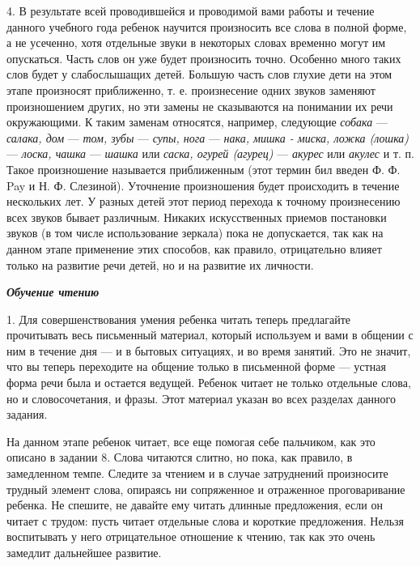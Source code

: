 \documentclass{book}
\renewcommand{\emph}[1]{\textit{#1}}
\begin{document}
4. В результате всей проводившейся и проводимой вами работы и течение
данного учебного года ребенок научится произносить все слова в полной
форме, а не усеченно, хотя отдельные звуки в некоторых словах временно
могут им опускаться. Часть слов он уже будет произносить точно. Особенно
много таких слов будет у слабослышащих детей. Большую часть слов глухие
дети на этом этапе произносят приближенно, т. е. произнесение одних
звуков заменяют произношением других, но эти замены не сказываются на
понимании их речи окружающими. К таким заменам относятся, например,
следующие \emph{собака} --- \emph{салака, дом} --- \emph{том, зубы} ---
\emph{супы, нога} --- \emph{нака, мишка - миска, ложка (лошка)} ---
\emph{лоска, чашка} --- \emph{шашка} или \emph{саска, огурей (агурец)}
--- \emph{акурес} или \emph{акулес} и т. п. Такое произношение
называется приближенным (этот термин бил введен Ф. Ф. Pay и Н. Ф.
Слезиной). Уточнение произношения будет происходить в течение нескольких
лет. У разных детей этот период перехода к точному произнесению всех
звуков бывает различным. Никаких искусственных приемов постановки звуков
(в том числе использование зеркала) пока не допускается, так как на
данном этапе применение этих способов, как правило, отрицательно влияет
только на развитие речи детей, но и на развитие их личности.

\emph{\textbf{Обучение чтению}}

1. Для совершенствования умения ребенка читать теперь предлагайте
прочитывать весь письменный материал, который используем и вами в
общении с ним в течение дня --- и в бытовых ситуациях, и во время
занятий. Это не значит, что вы теперь переходите на общение только в
письменной форме --- устная форма речи была и остается ведущей. Ребенок
читает не только отдельные слова, но и словосочетания, и фразы. Этот
материал указан во всех разделах данного задания.

На данном этапе ребенок читает, все еще помогая себе пальчиком, как это
описано в задании 8. Слова читаются слитно, но пока, как правило, в
замедленном темпе. Следите за чтением и в случае затруднений произносите
трудный элемент слова, опираясь ни сопряженное и отраженное
проговаривание ребенка. Не спешите, не давайте ему читать длинные
предложения, если он читает с трудом: пусть читает отдельные слова и
короткие предложения. Нельзя воспитывать у него отрицательное отношение
к чтению, так как это очень замедлит дальнейшее развитие.
\end{document}
